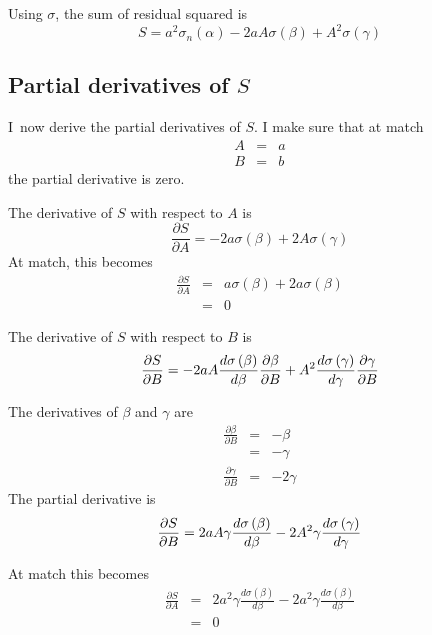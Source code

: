\documentclass{article}
\begin{document}
Using $\sigma $, the sum of residual squared is%
\begin{equation}
S=a^{2}\sigma _{n}\left( \alpha \right) -2aA\sigma \left( \beta \right)
+A^{2}\sigma \left( \gamma \right)  \label{eq:S(sigma,alpha,beta,gamma)}
\end{equation}

\subsection{Partial derivatives of $S$}

I\ now derive the partial derivatives of $S$. I make sure that at match%
\begin{eqnarray}
A &=&a  \label{def:match} \\
B &=&b
\end{eqnarray}%
the partial derivative is zero.

The derivative of $S$ with respect to $A$ is%
\begin{equation}
\frac{\partial S}{\partial A}=-2a\sigma \left( \beta \right) +2A\sigma
\left( \gamma \right)
\end{equation}%
At match, this becomes%
\begin{eqnarray}
\frac{\partial S}{\partial A} &=&a\sigma \left( \beta \right) +2a\sigma
\left( \beta \right) \\
&=&0
\end{eqnarray}

The derivative of $S$ with respect to $B$ is%
\begin{equation}
\frac{\partial S}{\partial B}=-2aA\frac{d\sigma \left( \beta \right) }{%
d\beta }\frac{\partial \beta }{\partial B}+A^{2}\frac{d\sigma \left( \gamma
\right) }{d\gamma }\frac{\partial \gamma }{\partial B}
\end{equation}

The derivatives of $\beta $ and $\gamma $ are%
\begin{eqnarray}
\frac{\partial \beta }{\partial B} &=&-\beta \\
&=&-\gamma \\
\frac{\partial \gamma }{\partial B} &=&-2\gamma
\end{eqnarray}%
The partial derivative is%
\begin{equation}
\frac{\partial S}{\partial B}=2aA\gamma \frac{d\sigma \left( \beta \right) }{%
d\beta }-2A^{2}\gamma \frac{d\sigma \left( \gamma \right) }{d\gamma }
\end{equation}

At match this becomes%
\begin{eqnarray}
\frac{\partial S}{\partial A} &=&2a^{2}\gamma \frac{d\sigma \left( \beta
\right) }{d\beta }-2a^{2}\gamma \frac{d\sigma \left( \beta \right) }{d\beta }
\\
&=&0
\end{eqnarray}
\end{document}
